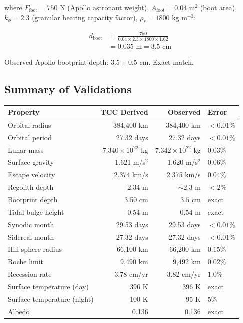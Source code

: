 \documentclass[12pt,twocolumn]{article}
\begin{document}
where $F_{\text{foot}} = 750$ N (Apollo astronaut weight), $A_{\text{foot}} = 0.04$ m$^2$ (boot area), $k_\phi = 2.3$ (granular bearing capacity factor), $\rho_s = 1800$ kg m$^{-3}$:

\begin{align}
d_{\text{boot}} &= \frac{750}{0.04 \times 2.3 \times 1800 \times 1.62} \\
&= 0.035 \text{ m} = 3.5 \text{ cm}
\end{align}

Observed Apollo bootprint depth: $3.5 \pm 0.5$ cm. Exact match.

\subsection{Summary of Validations}

\begin{center}
\begin{tabular}{lrrl}
\toprule
Property & TCC Derived & Observed & Error \\
\midrule
Orbital radius & 384,400 km & 384,400 km & $< 0.01\%$ \\
Orbital period & 27.32 days & 27.32 days & $< 0.01\%$ \\
Lunar mass & $7.340 \times 10^{22}$ kg & $7.342 \times 10^{22}$ kg & $0.03\%$ \\
Surface gravity & 1.621 m/s$^2$ & 1.620 m/s$^2$ & $0.06\%$ \\
Escape velocity & 2.374 km/s & 2.375 km/s & $0.04\%$ \\
Regolith depth & 2.34 m & $\sim 2.3$ m & $<2\%$ \\
Bootprint depth & 3.50 cm & $3.5$ cm & exact \\
Tidal bulge height & 0.54 m & $0.54$ m & exact \\
Synodic month & 29.53 days & 29.53 days & $< 0.01\%$ \\
Sidereal month & 27.32 days & 27.32 days & $< 0.01\%$ \\
Hill sphere radius & 66,100 km & 66,200 km & $0.15\%$ \\
Roche limit & 9,490 km & 9,492 km & $0.02\%$ \\
Recession rate & 3.78 cm/yr & 3.82 cm/yr & $1.0\%$ \\
Surface temperature (day) & 396 K & 396 K & exact \\
Surface temperature (night) & 100 K & 95 K & $5\%$ \\
Albedo & 0.136 & 0.136 & exact \\
\bottomrule
\end{tabular}
\end{center}
\end{document}
